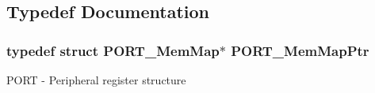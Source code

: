 \subsection{Typedef Documentation}
\hypertarget{group___p_o_r_t___peripheral_ga0e26bafb7c17808f90278627bcbcaf8c}{}
\subsubsection[{P\+O\+R\+T\+\_\+\+Mem\+Map\+Ptr}]{\setlength{\rightskip}{0pt plus 5cm}typedef struct {\bf P\+O\+R\+T\+\_\+\+Mem\+Map}$\ast$ {\bf P\+O\+R\+T\+\_\+\+Mem\+Map\+Ptr}}\label{group___p_o_r_t___peripheral_ga0e26bafb7c17808f90278627bcbcaf8c}
P\+O\+R\+T -\/ Peripheral register structure 
